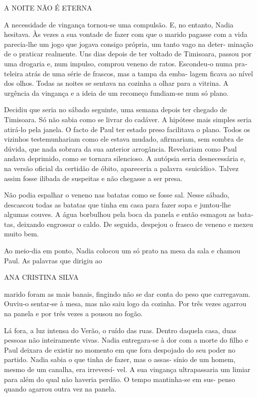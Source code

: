 A NOITE NÃO É ETERNA

A necessidade de vingança tornou‑se uma compulsão. E, no entanto, Nadia
hesitava. Às vezes a sua vontade de fazer com que o marido pagasse com a
vida parecia‑lhe um jogo que jogava consigo própria, um tanto vago na
deter‑ minação de o praticar realmente. Uns dias depois de ter voltado
de Timisoara, passou por uma drogaria e, num impulso, comprou veneno de
ratos. Escondeu‑o numa pra‑ teleira atrás de uma série de frascos, mas a
tampa da emba‑ lagem ficava ao nível dos olhos. Todas as noites se
sentava na cozinha a olhar para a vitrina. A urgência da vingança e a
ideia de um recomeço fundiam‑se num só plano.

Decidiu que seria no sábado seguinte, uma semana depois ter chegado de
Timisoara. Só não sabia como se livrar do cadáver. A hipótese mais
simples seria atirá‑lo pela janela. O facto de Paul ter estado preso
facilitava o plano. Todos os vizinhos testemunhariam como ele estava
mudado, afirmariam, sem sombra de dúvida, que nada sobrara da sua
anterior arrogância. Revelariam como Paul andava deprimido, como se
tornara silencioso. A autópsia seria desnecessária e, na versão oficial
da certidão de óbito, apareceria a palavra «suicídio». Talvez assim
fosse ilibada de suspeitas e não chegasse a ser presa.

Não podia espalhar o veneno nas batatas como se fosse sal. Nesse sábado,
descascou todas as batatas que tinha em casa para fazer sopa e
juntou‑lhe algumas couves. A água borbulhou pela boca da panela e então
esmagou as bata‑ tas, deixando engrossar o caldo. De seguida, despejou o
frasco de veneno e mexeu muito bem.

Ao meio‑dia em ponto, Nadia colocou um só prato na mesa da sala e chamou
Paul. As palavras que dirigiu ao

ANA CRISTINA SILVA

marido foram as mais banais, fingindo não se dar conta do peso que
carregavam. Ouviu‑o sentar‑se à mesa, mas não saiu logo da cozinha. Por
três vezes agarrou na panela e por três vezes a pousou no fogão.

Lá fora, a luz intensa do Verão, o ruído das ruas. Dentro daquela casa,
duas pessoas não inteiramente vivas. Nadia entregara‑se à dor com a
morte do filho e Paul deixara de existir no momento em que fora
despojado do seu poder no partido. Nadia sabia o que tinha de fazer, mas
o assas‑ sínio de um homem, mesmo de um canalha, era irreversí‑ vel. A
sua vingança ultrapassaria um limiar para além do qual não haveria
perdão. O tempo mantinha‑se em sus‑ penso quando agarrou outra vez na
panela.

